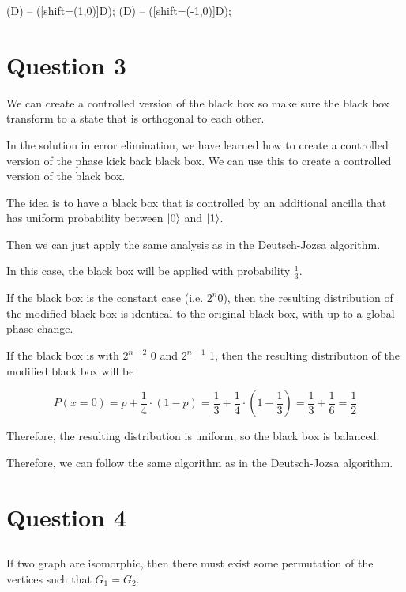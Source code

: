 \documentclass{article}
\theoremstyle{definition}
\DeclarePairedDelimiter\ket{\lvert}{\rangle}
\begin{document}
 (D) -- ([shift=({1,0})]D);
 (D) -- ([shift=({-1,0})]D);

\endtikzpicture

\pagebreak
\section{Question 3}

We can create a controlled version of the black box so make sure the black box transform
to a state that is orthogonal to each other.

In the solution in error elimination, we have learned how to create a
controlled version of the phase kick back black box. We can use this
to create a controlled version of the black box.

The idea is to have a black box that is controlled by an additional ancilla that has
uniform probability between $\ket{0}$ and $\ket{1}$.

Then we can just apply the same analysis as in the Deutsch-Jozsa algorithm.

In this case, the black box will be applied with probability $\frac{1}{3}$.

If the black box is the constant case (i.e. $2^n$0), then the resulting distribution of the modified black box is
identical to the original black box, with up to a global phase change.

If the black box is with $2^{n-2}$ 0 and $2^{n-1}$ 1, then the resulting distribution
of the modified black box will be

\[
  P(x=0) = p + \frac{1}{4} \cdot (1-p) = \frac{1}{3} + \frac{1}{4} \cdot (1-\frac{1}{3}) = \frac{1}{3} + \frac{1}{6} =\frac{1}{2}
\]

Therefore, the resulting distribution is uniform, so the black box is balanced.

Therefore, we can follow the same algorithm as in the Deutsch-Jozsa algorithm.

\pagebreak



\section{Question 4 }

\subsection{}

If two graph are isomorphic, then there must exist some permutation of the vertices
such that \(G_1=G_2\).
\end{document}
